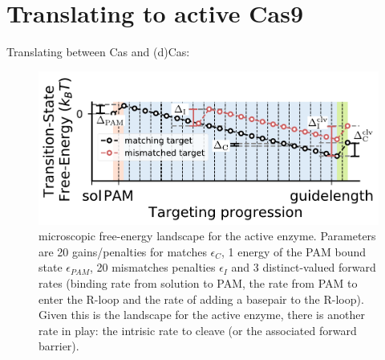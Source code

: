 \documentclass[a4paper,twoside]{revtex4-1}
\begin{document}
\section*{Translating to active Cas9}
Translating between Cas and (d)Cas: 
\begin{figure}[H]
	\centering
	\includegraphics[width=\textwidth]{cartoon_transition_state_landscape_v2_edit}
	\caption{microscopic free-energy landscape for the active enzyme. Parameters are 20 gains/penalties for matches $\epsilon_C$, 1 energy of the PAM bound state $\epsilon_{PAM}$, 20 mismatches penalties $\epsilon_I$ and 3 distinct-valued forward rates (binding rate from solution to PAM, the rate from PAM to enter the R-loop and the rate of adding a basepair to the R-loop). Given this is the landscape for the active enzyme, there is another rate in play: the intrisic rate to cleave (or the associated forward barrier). }
\end{figure}
\end{document}
